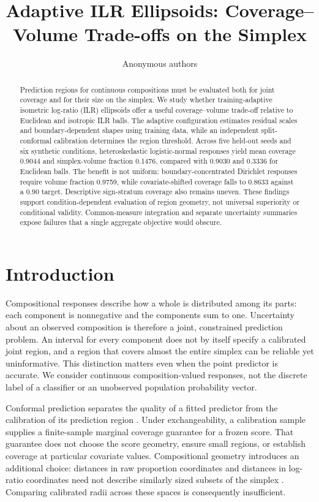 \documentclass{article}
\title{Adaptive ILR Ellipsoids: Coverage--Volume Trade-offs on the Simplex}
\author{Anonymous authors}
\begin{document}
\maketitle

\begin{abstract}
Prediction regions for continuous compositions must be evaluated both for joint coverage and for their size on the simplex. We study whether training-adaptive isometric log-ratio (ILR) ellipsoids offer a useful coverage--volume trade-off relative to Euclidean and isotropic ILR balls. The adaptive configuration estimates residual scales and boundary-dependent shapes using training data, while an independent split-conformal calibration determines the region threshold. Across five held-out seeds and six synthetic conditions, heteroskedastic logistic-normal responses yield mean coverage 0.9044 and simplex-volume fraction 0.1476, compared with 0.9030 and 0.3336 for Euclidean balls. The benefit is not uniform: boundary-concentrated Dirichlet responses require volume fraction 0.9759, while covariate-shifted coverage falls to 0.8633 against a 0.90 target. Descriptive sign-stratum coverage also remains uneven. These findings support condition-dependent evaluation of region geometry, not universal superiority or conditional validity. Common-measure integration and separate uncertainty summaries expose failures that a single aggregate objective would obscure.
\end{abstract}

\section{Introduction}
Compositional responses describe how a whole is distributed among its parts: each component is nonnegative and the components sum to one. Uncertainty about an observed composition is therefore a joint, constrained prediction problem. An interval for every component does not by itself specify a calibrated joint region, and a region that covers almost the entire simplex can be reliable yet uninformative. This distinction matters even when the point predictor is accurate. We consider continuous composition-valued responses, not the discrete label of a classifier or an unobserved population probability vector.

Conformal prediction separates the quality of a fitted predictor from the calibration of its prediction region \citep{Vovk2005,Papadopoulos2002,Angelopoulos2021}. Under exchangeability, a calibration sample supplies a finite-sample marginal coverage guarantee for a frozen score. That guarantee does not choose the score geometry, ensure small regions, or establish coverage at particular covariate values. Compositional geometry introduces an additional choice: distances in raw proportion coordinates and distances in log-ratio coordinates need not describe similarly sized subsets of the simplex \citep{Aitchison1982,Egozcue2003}. Comparing calibrated radii across these spaces is consequently insufficient.
\end{document}
